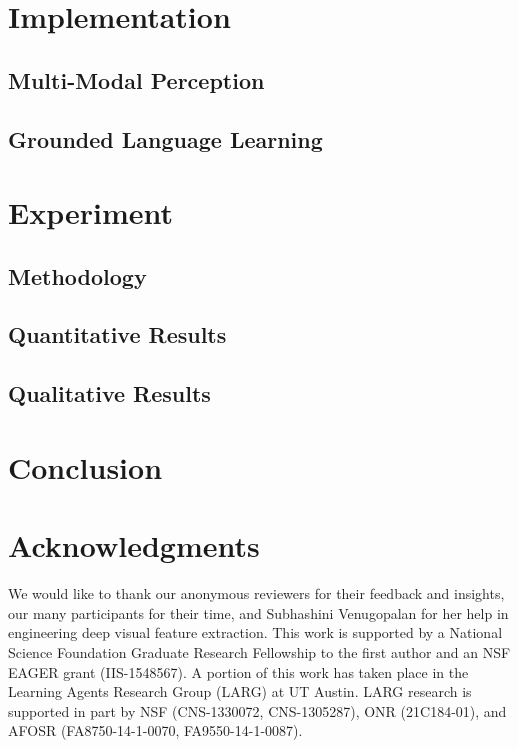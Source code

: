 \documentclass{article}
\begin{document}
\section{Implementation}
\label{sec:implementation}
	

	\subsection{Multi-Modal Perception}
	\label{ssec:mmp}
	

	\subsection{Grounded Language Learning}
	\label{ssec:gll}
	

\section{Experiment}
\label{sec:experiment}
	

	\subsection{Methodology}
	\label{ssec:methodology}
	

	\subsection{Quantitative Results}
	\label{ssec:results}
	

	\subsection{Qualitative Results}
	\label{ssec:qualitative}
	

\section{Conclusion}
\label{sec:conclusion}


\section*{Acknowledgments}

We would like to thank our anonymous reviewers for their feedback and insights, our many participants for their time, and Subhashini Venugopalan for her help in engineering deep visual feature extraction. This work is supported by a National Science Foundation Graduate Research Fellowship to the first author and an NSF EAGER grant (IIS-1548567). A portion of this work has taken place in the Learning Agents Research Group (LARG) at UT Austin. LARG research is supported in part by NSF (CNS-1330072, CNS-1305287), ONR (21C184-01), and AFOSR (FA8750-14-1-0070, FA9550-14-1-0087).



\end{document}
